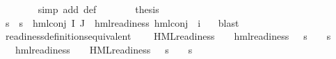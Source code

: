 \begin{isabellebody}
\ \ \ \ \ \ \isamarkupfalse%
\ {\isacharparenleft}{\kern0pt}simp\ add{\isacharcolon}{\kern0pt}\ {\isasymPsi}{\isacharunderscore}{\kern0pt}def{\isacharparenright}{\kern0pt}\isanewline
\ \ \ \ \isamarkupfalse%
\ \isamarkupfalse%
\ {\isacharquery}{\kern0pt}thesis\ \isanewline
\ \ \ \ \ \ \isamarkupfalse%
\ {\isacartoucheopen}{\isasymforall}s{\isachardot}{\kern0pt}\ {\isasymnot}\ s\ {\isasymTurnstile}\ hml{\isacharunderscore}{\kern0pt}conj\ I\ J\ {\isasymPhi}{\isacartoucheclose}\ {\isacartoucheopen}hml{\isacharunderscore}{\kern0pt}readiness\ {\isacharparenleft}{\kern0pt}hml{\isacharunderscore}{\kern0pt}conj\ {\isacharbraceleft}{\kern0pt}{\isacharbraceright}{\kern0pt}\ {\isacharbraceleft}{\kern0pt}i{\isacharunderscore}{\kern0pt}{\isasymphi}{\isacharbraceright}{\kern0pt}\ {\isasymPsi}{\isacharparenright}{\kern0pt}{\isacartoucheclose}\ \isamarkupfalse%
\ blast\isanewline
\ \ \isamarkupfalse%
\isanewline
{}\isamarkupfalse%
%
\endisatagproof
{\isafoldproof}%
%
\isadelimproof
\isanewline
%
\endisadelimproof
\isanewline
{}\isamarkupfalse%
\ readiness{\isacharunderscore}{\kern0pt}definitions{\isacharunderscore}{\kern0pt}equivalent{\isacharcolon}{\kern0pt}\ \isanewline
\ \ {\isachardoublequoteopen}{\isasymforall}{\isasymphi}{\isachardot}{\kern0pt}\ {\isacharparenleft}{\kern0pt}HML{\isacharunderscore}{\kern0pt}readiness\ {\isasymphi}\ {\isasymlongrightarrow}\ {\isacharparenleft}{\kern0pt}{\isasymexists}{\isasympsi}{\isachardot}{\kern0pt}\ hml{\isacharunderscore}{\kern0pt}readiness\ {\isasympsi}\ {\isasymand}\ {\isacharparenleft}{\kern0pt}s\ {\isasymTurnstile}\ {\isasympsi}\ {\isasymlongleftrightarrow}\ s\ {\isasymTurnstile}\ {\isasymphi}{\isacharparenright}{\kern0pt}{\isacharparenright}{\kern0pt}{\isacharparenright}{\kern0pt}{\isachardoublequoteclose}\isanewline
\ \ {\isachardoublequoteopen}{\isasymforall}{\isasymphi}{\isachardot}{\kern0pt}\ {\isacharparenleft}{\kern0pt}hml{\isacharunderscore}{\kern0pt}readiness\ {\isasymphi}\ {\isasymlongrightarrow}\ {\isacharparenleft}{\kern0pt}{\isasymexists}{\isasympsi}{\isachardot}{\kern0pt}\ HML{\isacharunderscore}{\kern0pt}readiness\ {\isasympsi}\ {\isasymand}\ {\isacharparenleft}{\kern0pt}s\ {\isasymTurnstile}\ {\isasympsi}\ {\isasymlongleftrightarrow}\ s\ {\isasymTurnstile}\ {\isasymphi}{\isacharparenright}{\kern0pt}{\isacharparenright}{\kern0pt}{\isacharparenright}{\kern0pt}{\isachardoublequoteclose}\isanewline
%
\isadelimproof
\ \ %
\endisadelimproof
%
\isatagproof
{}\isamarkupfalse%

\end{isabellebody}
